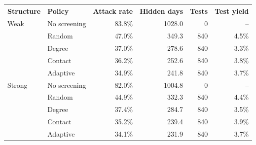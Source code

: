 \begin{tabular}{llrrrr}
\toprule
Structure & Policy & Attack rate & Hidden days & Tests & Test yield \\
\midrule
Weak & No screening & 83.8\% & 1028.0 & 0 & -- \\
 & Random & 47.0\% & 349.3 & 840 & 4.5\% \\
 & Degree & 37.0\% & 278.6 & 840 & 3.3\% \\
 & Contact & 36.2\% & 252.6 & 840 & 3.8\% \\
 & Adaptive & 34.9\% & 241.8 & 840 & 3.7\% \\
\midrule
Strong & No screening & 82.0\% & 1004.8 & 0 & -- \\
 & Random & 44.9\% & 332.3 & 840 & 4.4\% \\
 & Degree & 37.4\% & 284.7 & 840 & 3.5\% \\
 & Contact & 35.2\% & 239.4 & 840 & 3.9\% \\
 & Adaptive & 34.1\% & 231.9 & 840 & 3.7\% \\
\bottomrule
\end{tabular}
